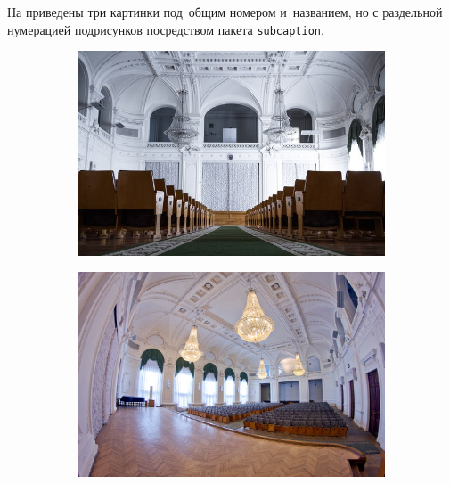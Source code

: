 На  приведены три картинки под~общим номером и~названием, но с раздельной нумерацией подрисунков посредством пакета \verb|subcaption|.
%
\begin{figure}[!htbp]
	\begin{subfigure}[t]{\dimexpr.3\linewidth-1.3em\relax}
		\centering
		\includegraphics[width=.95\linewidth,valign=t]{my_folder/images//spbpu_whitehall}
	\end{subfigure}
	\hfill %
	\begin{subfigure}[t]{\dimexpr.3\linewidth-1.3em\relax}
		\centering
		\includegraphics[width=.95\linewidth,valign=t]{my_folder/images//spbpu_whitehall_ligh}
	\end{subfigure}
	\hfill %

\end{figure}
